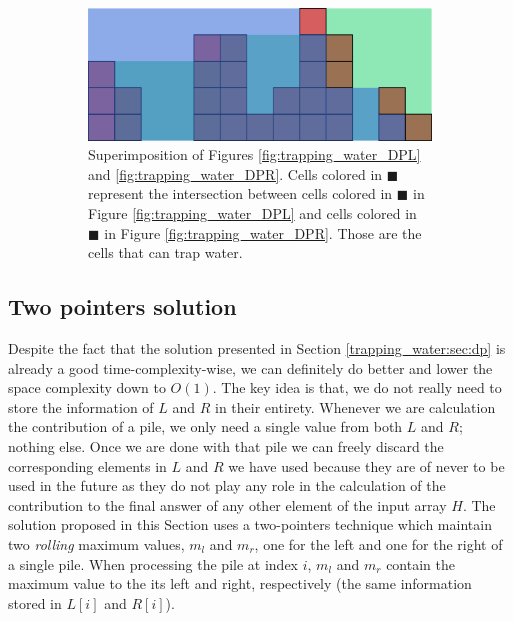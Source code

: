 \begin{figure}
\begin{subfigure}[b]{0.95\textwidth}
   \includegraphics[width=1\linewidth]{sources/trapping_water/images/DPLR}
   \caption{Superimposition of Figures \ref{fig:trapping_water_DPL} and \ref{fig:trapping_water_DPR}. Cells colored in \textcolor[HTML]{5aa1c7}{$\blacksquare$} represent the intersection between cells colored in \textcolor[HTML]{3268d5}{$\blacksquare$} in Figure \ref{fig:trapping_water_DPL} and cells colored in \textcolor[HTML]{32d579}{$\blacksquare$} in Figure \ref{fig:trapping_water_DPR}. Those are the cells that can trap water.}
   \label{fig:trapping_water_DPRL}
\end{subfigure}
\caption{}
\label{fig:trapping_water:dprl_main}
\end{figure}



\subsection{Two pointers solution}
\label{trapping_water:sec:two_pointers}
Despite the fact that the solution presented in Section \ref{trapping_water:sec:dp} is already a good time-complexity-wise, we can definitely do better and lower the space complexity down to $O(1)$.
The key idea is that, we do not really need to store the information of $L$ and $R$ in their entirety.
Whenever we are calculation the contribution of a pile,  we only need a single value from both $L$ and $R$; nothing else.
Once we are done with that pile we can freely discard the corresponding elements in $L$ and $R$ we have used because they are of never to be used in the future as they do not play any role in the calculation of the contribution to the final answer of any other element of the input array $H$.
The solution proposed in this Section uses a two-pointers technique which maintain two \textit{rolling} maximum values, $m_l$ and $m_r$, one for the left and one for the right of a single pile.
When processing the pile at index $i$, $m_l$ and $m_r$ contain the maximum value to the its left and right, respectively (the same information stored in $L[i]$ and $R[i]$).

